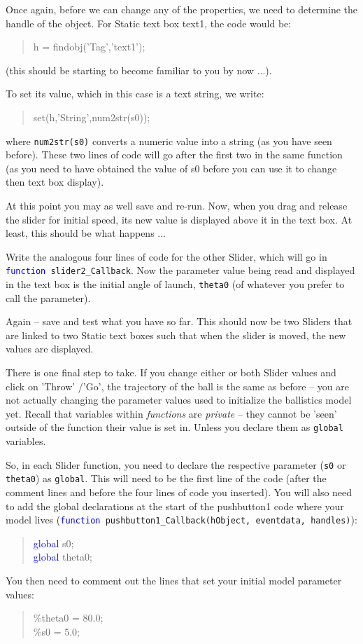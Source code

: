 \documentclass{tufte-book} %
\newenvironment{docspec}{\begin{quotation}\ttfamily\parskip0pt\parindent0pt\ignorespaces}{\end{quotation}}
\begin{document}
Once again, before we can change any of the properties, we need to determine the handle of the object. For \textsf{Static text} box \textsf{text1}, the code would be:
\begin{docspec}
h = findobj(\textcolor[rgb]{0.501961,0,1}{'Tag'},\textcolor[rgb]{0.501961,0,1}{'text1'});
\end{docspec}
(this should be starting to become familiar to you by now ...).

To set its value, which in this case is a text string, we write:
\begin{docspec}
set(h,\textcolor[rgb]{0.501961,0,1}{'String'},num2str(s0));
\end{docspec}
where \texttt{num2str(s0)} converts a numeric value into a string (as you have seen before). These two lines of code will go after the first two in the same function (as you need to have obtained the value of s0 before you can use it to change then text box display).

At this point you may as well save and re-run. Now, when you drag and release the slider for initial speed, its new value is displayed above it in the text box. At least, this should be what happens ...

Write the analogous four lines of code for the other Slider, which will go in \texttt{\textcolor{blue}{function} slider2\_Callback}. Now the parameter value being read and displayed in the text box is the initial angle of launch, \texttt{theta0} (of whatever you prefer to call the parameter).

Again -- save and test what you have so far. This should now be two \textsf{Sliders} that are linked to two \textsf{Static text} boxes such that when the slider is moved, the new values are displayed. 

There is one final step to take. If you change either or both \textsf{Slider} values and click on 'Throw' /'Go', the trajectory of the ball is the same as before -- you are not actually changing the parameter values used to initialize the ballistics model yet. Recall that variables within \textit{functions} are \textit{private} -- they cannot be 'seen' outside of the function their value is set in. Unless you declare them as \texttt{global} variables.

So, in each \textsf{Slider} function, you need to declare the respective parameter (\texttt{s0} or \texttt{theta0}) as \texttt{global}. This will need to be the first line of the code (after the comment lines and before the four lines of code you inserted). You will also need to add the global declarations at the start of the \textsf{pushbutton1} code where your model lives (\texttt{\textcolor{blue}{function} pushbutton1\_Callback(hObject, eventdata, handles)}):
\begin{docspec}
\textcolor{blue}{global} s0;
\\\textcolor{blue}{global} theta0;
\end{docspec}
You then need to comment out the lines that set your initial model parameter values:
\begin{docspec}
\textcolor[rgb]{0,0.501961,0}{\%theta0 = 80.0;
\\\%s0 = 5.0;}
\end{docspec}
\end{document}
